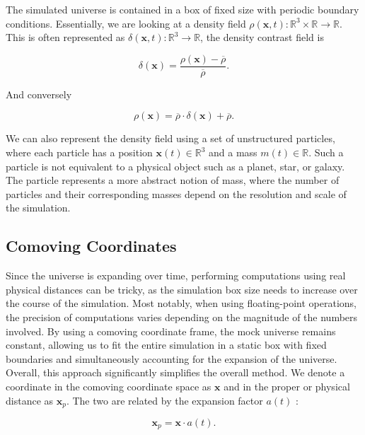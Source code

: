 \documentclass{article}
\begin{document}
The simulated universe is contained in a box of fixed size with periodic boundary conditions. Essentially, we are looking at a density field \(\rho(\mathbf{x}, t) \colon \mathbb{R}^3 \times \mathbb{R} \rightarrow \mathbb{R}\). This is often represented as \(\delta(\mathbf{x}, t) \colon \mathbb{R}^3 \rightarrow \mathbb{R}\), the density contrast field is

\begin{equation}
    \delta(\mathbf{x}) = \frac{\rho(\mathbf{x}) - \overline{\rho}}{\overline{\rho}}.
\end{equation}

And conversely

\begin{equation}
    \rho(\mathbf{x}) = \overline{\rho} \cdot \delta(\mathbf{x}) + \overline{\rho}.
\end{equation}

We can also represent the density field using a set of unstructured particles, where each particle has a position \(\mathbf{x}(t) \in \mathbb{R}^3\) and a mass \(m(t) \in \mathbb{R}\). Such a particle is not equivalent to a physical object such as a planet, star, or galaxy. The particle represents a more abstract notion of mass, where the number of particles and their corresponding masses depend on the resolution and scale of the simulation.

\subsection{Comoving Coordinates}
Since the universe is expanding over time, performing computations using real physical distances can be tricky, as the simulation box size needs to increase over the course of the simulation. Most notably, when using floating-point operations, the precision of computations varies depending on the magnitude of the numbers involved. By using a comoving coordinate frame, the mock universe remains constant, allowing us to fit the entire simulation in a static box with fixed boundaries and simultaneously accounting for the expansion of the universe. Overall, this approach significantly simplifies the overall method. We denote a coordinate in the comoving coordinate space as \(\mathbf{x}\) and in the proper or physical distance as \(\mathbf{x}_p\). The two are related by the expansion factor \(a(t)\) \citep{schutz2003gravity}:

\begin{equation}
    \mathbf{x}_p = \mathbf{x} \cdot a(t).
\end{equation}
\end{document}
